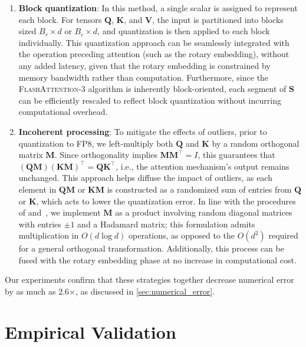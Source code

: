 \begin{enumerate}

\item \textbf{Block quantization}: In this method, a single scalar is assigned to represent each block. For tensors $\mathbf{Q}$, $\mathbf{K}$, and $\mathbf{V}$, the input is partitioned into blocks sized $B_r \times d$ or $B_c \times d$, and quantization is then applied to each block individually. This quantization approach can be seamlessly integrated with the operation preceding attention (such as the rotary embedding), without any added latency, given that the rotary embedding is constrained by memory bandwidth rather than computation. Furthermore, since the \textsc{FlashAttention-3} algorithm is inherently block-oriented, each segment of $\mathbf{S}$ can be efficiently rescaled to reflect block quantization without incurring computational overhead.

\item \textbf{Incoherent processing}: To mitigate the effects of outliers, prior to quantization to FP8, we left-multiply both $\mathbf{Q}$ and $\mathbf{K}$ by a random orthogonal matrix $\mathbf{M}$. Since orthogonality implies $\mathbf{M} \mathbf{M}^\top = I$, this guarantees that $(\mathbf{Q} \mathbf{M})(\mathbf{K} \mathbf{M})^\top = \mathbf{Q} \mathbf{K}^\top$, i.e., the attention mechanism’s output remains unchanged. This approach helps diffuse the impact of outliers, as each element in $\mathbf{Q} \mathbf{M}$ or $\mathbf{K} \mathbf{M}$ is constructed as a randomized sum of entries from $\mathbf{Q}$ or $\mathbf{K}$, which acts to lower the quantization error. In line with the procedures of \citet{chee2024quip} and~\citet{tseng2024quip}, we implement $\mathbf{M}$ as a product involving random diagonal matrices with entries $\pm1$ and a Hadamard matrix; this formulation admits multiplication in $O(d \log d)$ operations, as opposed to the $O(d^2)$ required for a general orthogonal transformation. Additionally, this process can be fused with the rotary embedding phase at no increase in computational cost.

\end{enumerate}

Our experiments confirm that these strategies together decrease numerical error by as much as 2.6$\times$, as discussed in \cref{sec:numerical_error}.

\section{Empirical Validation}
\label{sec:exp}

